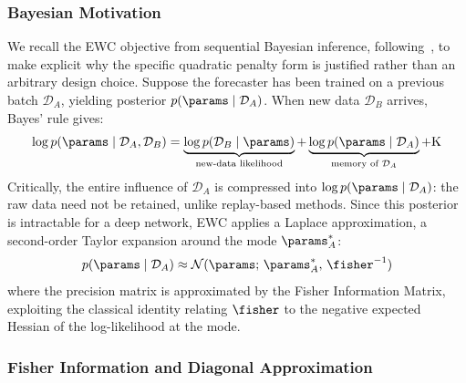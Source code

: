 \subsubsection{Bayesian Motivation}
\label{sec:bayesian}

We recall the EWC objective from sequential Bayesian inference,
following~\cite{kirkpatrick2017overcoming}, to make explicit why the
specific quadratic penalty form is justified rather than an arbitrary
design choice. Suppose the forecaster has been trained on a previous
batch $\mathcal{D}_A$, yielding posterior $p(\params \mid \mathcal{D}_A)$.
When new data $\mathcal{D}_B$ arrives, Bayes' rule gives:
\begin{equation}
    \log p(\params \mid \mathcal{D}_A, \mathcal{D}_B) =
    \underbrace{\log p(\mathcal{D}_B \mid \params)}_{\text{new-data likelihood}}
    + \underbrace{\log p(\params \mid \mathcal{D}_A)}_{\text{memory of }\mathcal{D}_A}
    + \text{K}
    \label{eq:log_posterior}
\end{equation}
Critically, the entire influence of $\mathcal{D}_A$ is compressed into
$\log p(\params \mid \mathcal{D}_A)$: the raw data need not be retained,
unlike replay-based methods. Since this posterior is intractable for a
deep network, EWC applies a Laplace approximation, a second-order
Taylor expansion around the mode $\params_A^*$:
\begin{equation}
    p(\params \mid \mathcal{D}_A) \approx
    \mathcal{N}(\params;\, \params_A^*,\, \fisher^{-1})
    \label{eq:fisher_posterior}
\end{equation}
where the precision matrix is approximated by the Fisher Information
Matrix, exploiting the classical identity relating $\fisher$ to the
negative expected Hessian of the log-likelihood at the mode.

\subsubsection{Fisher Information and Diagonal Approximation}
\label{sec:fisher}

